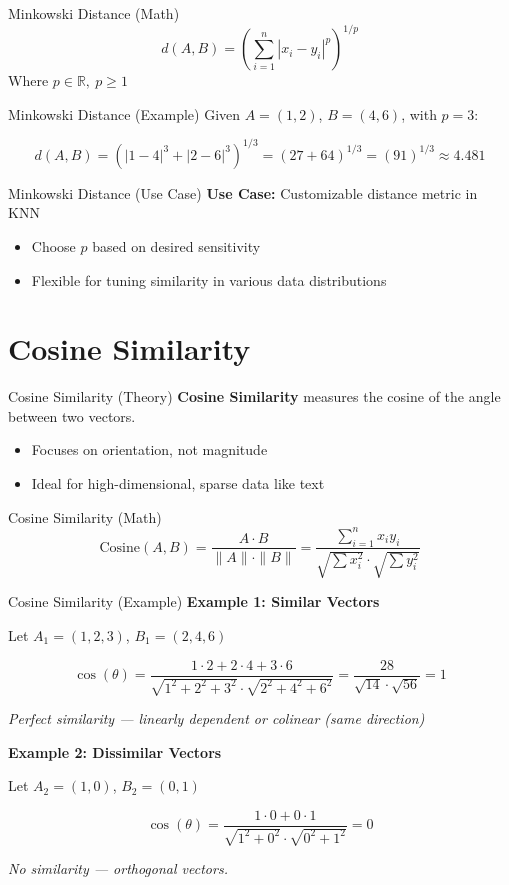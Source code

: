 \documentclass{beamer}
\begin{document}
\begin{frame}{Minkowski Distance (Math)}
\[
d(A, B) = \left( \sum_{i=1}^{n} |x_i - y_i|^p \right)^{1/p}
\]
Where \( p \in \mathbb{R},\ p \geq 1 \)
\end{frame}
\begin{frame}{Minkowski Distance (Example)}
Given \( A = (1, 2) \), \( B = (4, 6) \), with \( p = 3 \):

\[
d(A, B) = \left(|1 - 4|^3 + |2 - 6|^3\right)^{1/3}
= \left(27 + 64\right)^{1/3} = (91)^{1/3} \approx 4.481
\]
\end{frame}

\begin{frame}{Minkowski Distance (Use Case)}
\textbf{Use Case:} Customizable distance metric in KNN
\begin{itemize}
    \item Choose \( p \) based on desired sensitivity
    \item Flexible for tuning similarity in various data distributions
\end{itemize}
\end{frame}

\section{Cosine Similarity}
\begin{frame}{Cosine Similarity (Theory)}
\textbf{Cosine Similarity} measures the cosine of the angle between two vectors.
\begin{itemize}
    \item Focuses on orientation, not magnitude
    \item Ideal for high-dimensional, sparse data like text
\end{itemize}
\end{frame}

\begin{frame}{Cosine Similarity (Math)}
\[
\text{Cosine}(A, B) = \frac{A \cdot B}{\|A\| \cdot \|B\|} = \frac{\sum_{i=1}^{n} x_i y_i}{\sqrt{\sum x_i^2} \cdot \sqrt{\sum y_i^2}}
\]
\end{frame}
\begin{frame}{Cosine Similarity (Example)}
\textbf{Example 1: Similar Vectors}

Let \( A_1 = (1, 2, 3) \), \( B_1 = (2, 4, 6) \)

\[
\cos(\theta) = \frac{1\cdot2 + 2\cdot4 + 3\cdot6}{\sqrt{1^2+2^2+3^2} \cdot \sqrt{2^2+4^2+6^2}} = \frac{28}{\sqrt{14} \cdot \sqrt{56}} = 1
\]

\textit{Perfect similarity — linearly dependent or colinear (same direction)}

\vspace{1em}

\textbf{Example 2: Dissimilar Vectors}

Let \( A_2 = (1, 0) \), \( B_2 = (0, 1) \)

\[
\cos(\theta) = \frac{1\cdot0 + 0\cdot1}{\sqrt{1^2+0^2} \cdot \sqrt{0^2+1^2}} = 0
\]

\textit{No similarity — orthogonal vectors.}
\end{frame}
\end{document}
